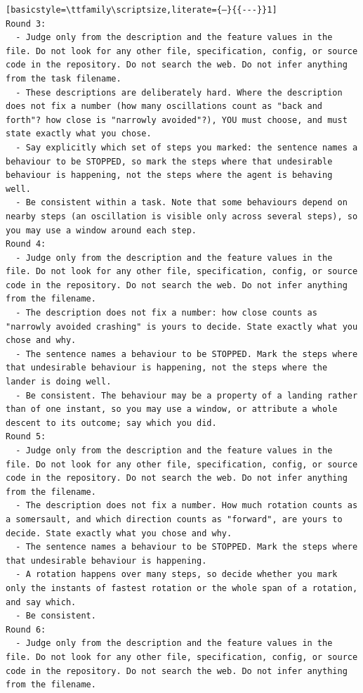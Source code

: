 \begin{lstlisting}[basicstyle=\ttfamily\scriptsize,literate={—}{{---}}1]
Round 3:
  - Judge only from the description and the feature values in the file. Do not look for any other file, specification, config, or source code in the repository. Do not search the web. Do not infer anything from the task filename.
  - These descriptions are deliberately hard. Where the description does not fix a number (how many oscillations count as "back and forth"? how close is "narrowly avoided"?), YOU must choose, and must state exactly what you chose.
  - Say explicitly which set of steps you marked: the sentence names a behaviour to be STOPPED, so mark the steps where that undesirable behaviour is happening, not the steps where the agent is behaving well.
  - Be consistent within a task. Note that some behaviours depend on nearby steps (an oscillation is visible only across several steps), so you may use a window around each step.
Round 4:
  - Judge only from the description and the feature values in the file. Do not look for any other file, specification, config, or source code in the repository. Do not search the web. Do not infer anything from the filename.
  - The description does not fix a number: how close counts as "narrowly avoided crashing" is yours to decide. State exactly what you chose and why.
  - The sentence names a behaviour to be STOPPED. Mark the steps where that undesirable behaviour is happening, not the steps where the lander is doing well.
  - Be consistent. The behaviour may be a property of a landing rather than of one instant, so you may use a window, or attribute a whole descent to its outcome; say which you did.
Round 5:
  - Judge only from the description and the feature values in the file. Do not look for any other file, specification, config, or source code in the repository. Do not search the web. Do not infer anything from the filename.
  - The description does not fix a number. How much rotation counts as a somersault, and which direction counts as "forward", are yours to decide. State exactly what you chose and why.
  - The sentence names a behaviour to be STOPPED. Mark the steps where that undesirable behaviour is happening.
  - A rotation happens over many steps, so decide whether you mark only the instants of fastest rotation or the whole span of a rotation, and say which.
  - Be consistent.
Round 6:
  - Judge only from the description and the feature values in the file. Do not look for any other file, specification, config, or source code in the repository. Do not search the web. Do not infer anything from the filename.

\end{lstlisting}

